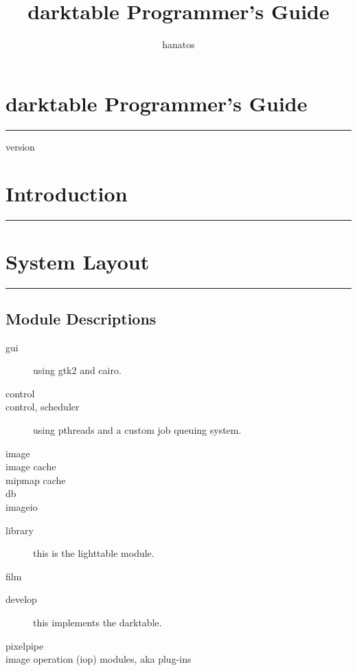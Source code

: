 \documentclass[a4paper,twoside]{scrartcl}
\title{darktable Programmer's Guide}
\author{hanatos}
\newcommand{\nicesection}[2]{%
\cleardoublepage
\fbox{\texttt{[image: \#1]}}%
\vspace*{-1em}%
\section{\hfill #2}
\hrule
\vspace*{\baselineskip}%
}
\begin{document}
%
\vspace*{-1em}%
\section*{\hfill darktable Programmer's Guide}
\hrule

\vspace*{4\baselineskip}

{\hfill version  }

\thispagestyle{empty}

\newpage
\tableofcontents


\nicesection{header1}{Introduction}
\label{sec:introduction}


\nicesection{header2}{System Layout}

\resizebox{\linewidth}{!}{}

\subsection{Module Descriptions}

\begin{description}
  \item[gui] using gtk2 and cairo.
\end{description}
\begin{description}
  \item[control]
  \item[control, scheduler] using pthreads and a custom job queuing system.
\end{description}
\begin{description}
  \item[image]
  \item[image cache]
  \item[mipmap cache]
  \item[db]
  \item[imageio]
\end{description}
\begin{description}
  \item[library] this is the lighttable module.
  \item[film]
\end{description}
\begin{description}
  \item[develop] this implements the darktable.
  \item[pixelpipe]
  \item[image operation (iop) modules, aka plug-ins]
\end{description}
\end{document}
